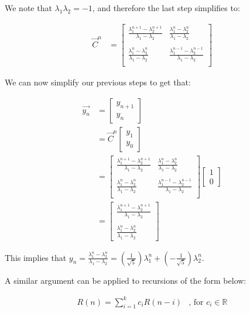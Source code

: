 \documentclass{article}
\begin{document}
We note that $\lambda_{1}\lambda_{2}=-1$, and therefore the last step simplifies to:

\begin{align*}
\vec{C}^{n}
&=
\begin{bmatrix}
\frac{\lambda_{1}^{n+1} - \lambda_{2}^{n+1}}{\lambda_{1}-\lambda_{2}}
& \frac{\lambda_{1}^{n} - \lambda_{2}^{n}}{\lambda_{1}-\lambda_{2}}\\
 & \\
\frac{\lambda_{1}^{n} - \lambda_{2}^{n}}{\lambda_{1}-\lambda_{2}}
& \frac{\lambda_{1}^{n-1} - \lambda_{2}^{n-1}}{\lambda_{1}-\lambda_{2}} \\
\end{bmatrix}
\end{align*}

We can now simplify our previous steps to get that:

\begin{align*}
\vec{y_{n}}
&=
\begin{bmatrix}
y_{n+1} \\
y_{n}
\end{bmatrix}\\
&=
\vec{C}^{n}
\begin{bmatrix}
y_{1} \\
y_{0}
\end{bmatrix}\\
&=
\begin{bmatrix}
\frac{\lambda_{1}^{n+1} - \lambda_{2}^{n+1}}{\lambda_{1}-\lambda_{2}}
& \frac{\lambda_{1}^{n} - \lambda_{2}^{n}}{\lambda_{1}-\lambda_{2}}\\
 & \\
\frac{\lambda_{1}^{n} - \lambda_{2}^{n}}{\lambda_{1}-\lambda_{2}}
& \frac{\lambda_{1}^{n-1} - \lambda_{2}^{n-1}}{\lambda_{1}-\lambda_{2}} \\
\end{bmatrix}
\begin{bmatrix}
1 \\
0
\end{bmatrix}\\
&=
\begin{bmatrix}
\frac{\lambda_{1}^{n+1} - \lambda_{2}^{n+1}}{\lambda_{1}-\lambda_{2}} \\
\\
\frac{\lambda_{1}^{n} - \lambda_{2}^{n}}{\lambda_{1}-\lambda_{2}}
\end{bmatrix}
\end{align*}

This implies that
$y_{n}=\frac{\lambda_{1}^{n} - \lambda_{2}^{n}}{\lambda_{1}-\lambda_{2}}=\left(\frac{1}{\sqrt{5}}\right)\lambda_{1}^{n}+\left(-\frac{1}{\sqrt{5}}\right)\lambda_{2}^{n}$.

A similar argument can be applied to recursions of the form below:

\begin{align*}
R(n)=\sum_{i=1}^{k}c_{i}R(n-i) & \text{, for } c_{i} \in \mathbb{R}
\end{align*}
\end{document}
